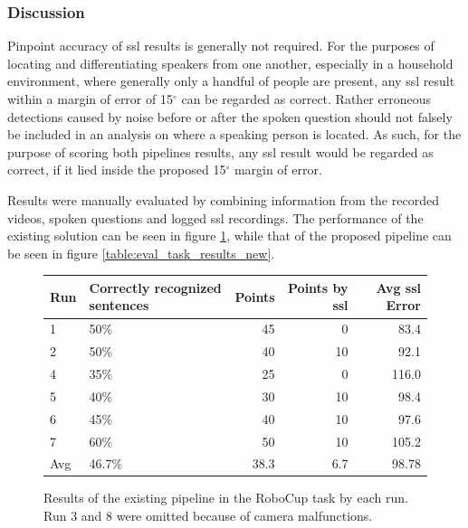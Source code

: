 \subsubsection{Discussion}
Pinpoint accuracy of \gls{ssl} results is generally not required.
For the purposes of locating and differentiating speakers from one another, especially in a household environment, where generally only a handful of people are present, any \gls{ssl} result within a margin of error of 15$^\circ$ can be regarded as correct.
Rather erroneous detections caused by noise before or after the spoken question should not falsely be included in an analysis on where a speaking person is located.
As such, for the purpose of scoring both pipelines results, any \gls{ssl} result would be regarded as correct, if it lied inside the proposed 15$^\circ$ margin of error.

Results were manually evaluated by combining information from the recorded videos, spoken questions and logged \gls{ssl} recordings.
The performance of the existing solution can be seen in figure \ref{table:eval_task_results_old}, while that of the proposed pipeline can be seen in figure \ref{table:eval_task_results_new}.

\begin{figure}[]
	\begin{tabular}{ | l | p{3.5cm} | r | r | r |}
		\hline
		Run & Correctly recognized sentences & Points & Points by \gls{ssl} & Avg \gls{ssl} Error \\ \hline
		1 & 50\% & 45 & 0 & 83.4\\ \hline
		2 & 50\% & 40 & 10 & 92.1\\ \hline
		4 & 35\% & 25 &  0 & 116.0\\ \hline
		5 & 40\% & 30 & 10 & 98.4\\ \hline
		6 & 45\% & 40 & 10 & 97.6\\ \hline
		7 & 60\% & 50 & 10 & 105.2\\ \hhline{|=|=|=|=|=|}
		Avg & 46.7\% & 38.3 & 6.7 & 98.78 \\
		\hline
	\end{tabular}
	\caption{Results of the existing pipeline in the RoboCup task by each run.
		Run 3 and 8 were omitted because of camera malfunctions.}
	\label{table:eval_task_results_old}
\end{figure}

